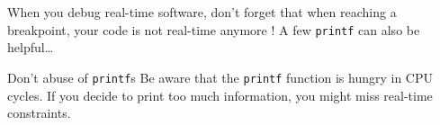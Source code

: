 When you debug real-time software, don't forget that when reaching a breakpoint, your code is not real-time anymore ! A few \texttt{printf} can also be helpful\dots

\begin{bclogo}[couleur = gray!20, arrondi = 0.2, logo=\bcattention]{Don't abuse of \texttt{printf}s}
Be aware that the \texttt{printf} function is hungry in CPU cycles. If you decide to print too much information, you might miss real-time constraints.
\end{bclogo}
